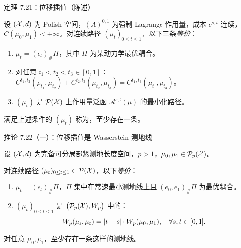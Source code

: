 \begin{frame}{定理 7.21：位移插值（陈述）}

  设 $(\mathcal{X},d)$ 为 Polish 空间，$(A)^{0,1}$ 为强制 Lagrange 作用量，成本 $c^{s,t}$ 连续，
  $C(\mu_{0},\mu_{1})<+\infty$。对连续路径 $(\mu_{t})_{0\le t\le1}$，以下三条\emph{等价}：
  \begin{enumerate}
    \item[(i)] $\mu_{t}=(e_{t})_{\#}\Pi$，其中 $\Pi$ 为某动力学最优耦合。
    \item[(ii)] 对任意 $t_{1}<t_{2}<t_{3}\in[0,1]$：
      $C^{t_{1},t_{2}}(\mu_{t_{1}},\mu_{t_{2}})+C^{t_{2},t_{3}}(\mu_{t_{2}},\mu_{t_{3}})
      =C^{t_{1},t_{3}}(\mu_{t_{1}},\mu_{t_{3}})$。
    \item[(iii)] $(\mu_{t})$ 是 $\mathcal{P}(\mathcal{X})$ 上作用量泛函 $\mathcal{A}^{s,t}(\mu)$ 的最小化路径。
  \end{enumerate}
  满足上述条件的 $(\mu_{t})$ 称为，至少存在一条。

\end{frame}

\begin{frame}{推论 7.22（一）：位移插值是 Wasserstein 测地线}

  设 $(\mathcal{X},d)$ 为完备可分局部紧测地长度空间，$p>1$，$\mu_{0},\mu_{1}\in\mathcal{P}_{p}(\mathcal{X})$。

  对连续路径 $(\mu_{t})_{0\le t\le1}\subset\mathcal{P}(\mathcal{X})$，以下\emph{等价}：
  \begin{enumerate}
    \item[(i)] $\mu_{t}=(e_{t})_{\#}\Pi$，$\Pi$ 集中在常速最小测地线上且 $(e_{0},e_{1})_{\#}\Pi$ 为最优耦合。
    \item[(ii)] $(\mu_{t})_{0\le t\le1}$ 是 $\bigl(\mathcal{P}_{p}(\mathcal{X}),W_{p}\bigr)$ 中的：
      \[
        W_{p}(\mu_{s},\mu_{t})=|t-s|\cdot W_{p}(\mu_{0},\mu_{1}),\quad\forall s,t\in[0,1].
      \]
  \end{enumerate}
  对任意 $\mu_{0},\mu_{1}$，至少存在一条这样的测地线。

\end{frame}

